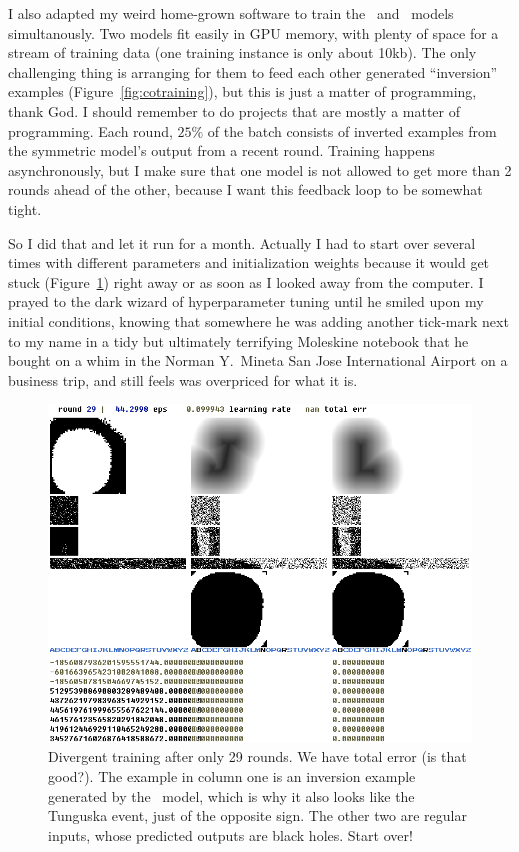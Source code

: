 \documentclass[twocolumn]{article} %
\begin{document}
I also adapted my weird home-grown software to train the
\makeuppercase\ and \makelowercase\ models simultanously. Two models
fit easily in GPU memory, with plenty of space for a stream of
training data (one training instance is only about 10kb). The only
challenging thing is arranging for them to feed each other generated
``inversion'' examples (Figure~\ref{fig:cotraining}), but this is just
a matter of programming, thank God. I should remember to do projects
that are mostly a matter of programming. Each round, $25\%$ of the
batch consists of inverted examples from the symmetric model's output
from a recent round. Training happens asynchronously, but I make sure
that one model is not allowed to get more than 2 rounds ahead of the
other, because I want this feedback loop to be somewhat tight.

So I did that and let it run for a month. Actually I had to start over
several times with different parameters and initialization weights
because it would get stuck (Figure~\ref{fig:nans}) right away or as
soon as I looked away from the computer. I prayed to the dark wizard
of hyperparameter tuning until he smiled upon my initial conditions,
knowing that somewhere he was adding another tick-mark next to my name
in a tidy but ultimately terrifying Moleskine notebook that he bought
on a whim in the Norman Y.~Mineta San Jose International Airport on a
business trip, and still feels was overpriced for what it is.

\begin{figure}[ht]
\centering
  \includegraphics[width=0.9 \linewidth]{nans}
\caption{
  Divergent training after only 29 rounds. We have \nan{} total error
  (is that good?). The example in column one is an inversion example
  generated by the \makeuppercase\ model, which is why it also looks
  like the Tunguska event, just of the opposite sign. The other two
  are regular inputs, whose predicted outputs are black holes. Start
  over!
} \label{fig:nans}
\end{figure}
\end{document}

